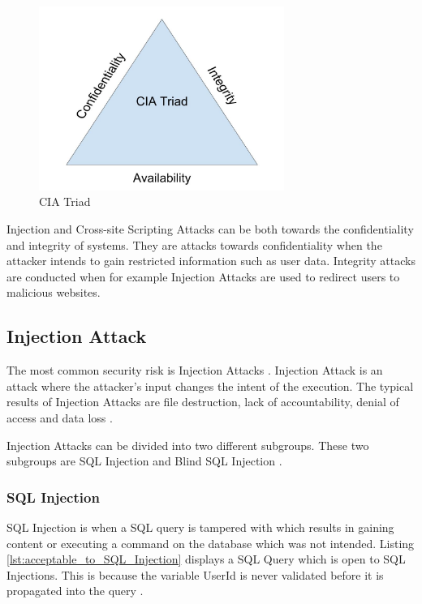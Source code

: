 \begin{figure}[H]
    \centering
    \includegraphics[height=6cm]{images/CIATriad.jpg}
    \caption{CIA Triad}
    \label{fig:CIATriad}
\end{figure}

Injection and Cross-site Scripting Attacks can be both towards the confidentiality and integrity of systems. They are attacks towards confidentiality when the attacker intends to gain restricted information such as user data. Integrity attacks are conducted when for example Injection Attacks are used to redirect users to malicious websites.



\subsection{Injection Attack}
The most common security risk is Injection Attacks \parencite{OWASP2017}. Injection Attack is an attack where the attacker's input changes the intent of the execution. The typical results of Injection Attacks are file destruction, lack of accountability, denial of access and data loss \parencite{Secure_Web}.

Injection Attacks can be divided into two different subgroups. These two subgroups are SQL Injection and Blind SQL Injection \parencite{Secure_Web}.



\subsubsection{SQL Injection}
SQL Injection is when a SQL query is tampered with which results in gaining content or executing a command on the database which was not intended. Listing \ref{lst:acceptable_to_SQL_Injection} displays a SQL Query which is open to SQL Injections. This is because the variable UserId is never validated before it is propagated into the query \parencite{JustinClarke-Salt2009SIAa, Secure_Web}.

